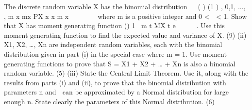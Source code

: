 The discrete random variable X has the binomial distribution
  ( ) (1 ) , 0,1, ..., , m x mx PX x x m
x
     
where m is a positive integer and 0 <  < 1. Show that X has moment
generating function
() 1 m t MX t e     .
Use this moment generating function to find the expected value and variance
of X.
(9)
(ii) X1, X2, …, Xn are independent random variables, each with the binomial
distribution given in part (i) in the special case where m = 1. Use moment
generating functions to prove that S = X1 + X2 + … + Xn is also a binomial
random variable.
(5)
(iii) State the Central Limit Theorem. Use it, along with the results from parts (i)
and (ii), to prove that the binomial distribution with parameters n and  can be
approximated by a Normal distribution for large enough n. State clearly the
parameters of this Normal distribution.
(6)

